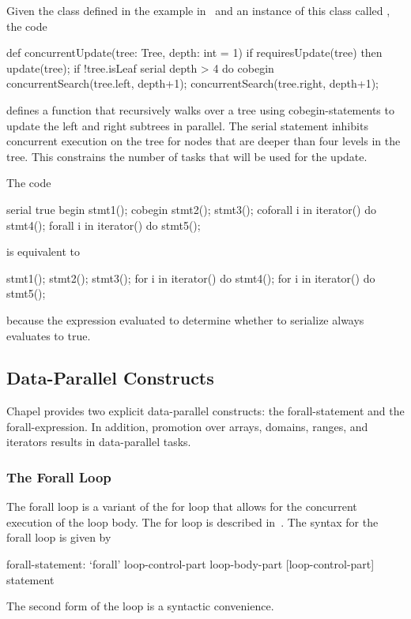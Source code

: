 \begin{example}
Given the  class defined in the example
in~ and an instance of this class
called , the code
\begin{chapel}
def concurrentUpdate(tree: Tree, depth: int = 1) {
  if requiresUpdate(tree) then
    update(tree);
  if !tree.isLeaf {
    serial depth > 4 do cobegin {
      concurrentSearch(tree.left, depth+1);
      concurrentSearch(tree.right, depth+1);
    }
  }
}
\end{chapel}
defines a function  that recursively walks over
a tree using cobegin-statements to update the left and right subtrees
in parallel.  The serial statement inhibits concurrent execution on
the tree for nodes that are deeper than four levels in the tree.  This
constrains the number of tasks that will be used for the update.
\end{example}

\begin{example}
The code
\begin{chapel}
serial true {
  begin stmt1();
  cobegin {
    stmt2();
    stmt3();
  }
  coforall i in iterator() do stmt4();
  forall i in iterator() do stmt5();
}
\end{chapel}
is equivalent to
\begin{chapel}
stmt1();
{
  stmt2();
  stmt3();
}
for i in iterator() do stmt4();
for i in iterator() do stmt5();
\end{chapel}
because the expression evaluated to determine whether to serialize
always evaluates to true.
\end{example}

\subsection{Data-Parallel Constructs}
\label{data_parallelism}

Chapel provides two explicit data-parallel constructs: the
forall-statement and the forall-expression.  In addition, promotion
over arrays, domains, ranges, and iterators results in data-parallel
tasks.

\subsubsection{The Forall Loop}
\label{Forall}

The forall loop is a variant of the for loop that allows for the
concurrent execution of the loop body. The for loop is described
in~. The syntax for the forall loop is given by
\begin{syntax}
forall-statement:
  `forall' loop-control-part loop-body-part
  [loop-control-part] statement
\end{syntax}
The second form of the loop is a syntactic convenience.

